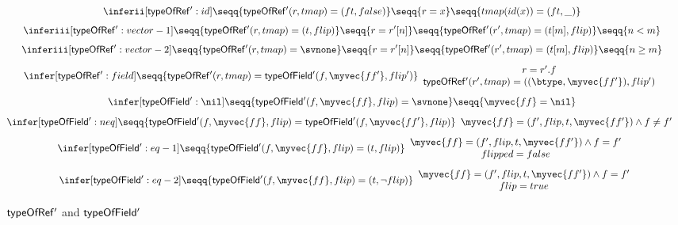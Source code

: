 {\begin{figure}[htbp]
  \small
  \begin{gather*}
   \inferii[{\sf typeOfRef'}: id]
    {\seqq{{\sf typeOfRef'}(r, tmap) = (ft, false)}}
    {\seqq{r = x}} {\seqq{tmap(id(x)) = (ft, \_)}}
    \quad
    \\[1ex]
   \inferiii[{\sf typeOfRef'}: vector-1]
    {\seqq{{\sf typeOfRef'}(r, tmap) = (t, flip)}}
    {\seqq{r = r'[n]}} {\seqq{{\sf typeOfRef'}(r', tmap) =  (t[m], flip)}} {\seqq{n < m}}
    \quad
    \\[1ex]
   \inferiii[{\sf typeOfRef'}: vector-2]
    {\seqq{{\sf typeOfRef'}(r, tmap) = \svnone}}
    {\seqq{r = r'[n]}} {\seqq{{\sf typeOfRef'}(r', tmap) = (t[m], flip)}} {\seqq{n \ge m}}
    \quad
    \\[1ex]
   \infer[{\sf typeOfRef'}: field]
    {\seqq{{\sf typeOfRef'}(r, tmap) = {\sf typeOfField'}(f, \myvec{ff'}, flip')}}
    {
    \begin{array}{c}
    r = r'.f \\
    {\sf typeOfRef'}(r', tmap) = ((\btype, \myvec{ff'}), flip')
    \end{array}
    }
    \quad
    \\[1ex]
   \infer[{\sf typeOfField'} : \nil]
    {\seqq{{\sf typeOfField'}(f, \myvec{ff}, flip) = \svnone}}
    {\seqq{\myvec{ff} = \nil}}
    \quad
    \\[1ex]
   \infer[{\sf typeOfField'}: neq]
    {\seqq{{\sf typeOfField'}(f, \myvec{ff}, flip) = {\sf typeOfField'}(f, \myvec{ff'}, flip)}}
    {
    \begin{array}{c}
    \myvec{ff} = (f', flip, t, \myvec{ff'})\wedge f \neq f'
    \end{array}
    }
    \quad
    \\[1ex]
   \infer[{\sf typeOfField'}: eq-1]
    {\seqq{{\sf typeOfField'}(f, \myvec{ff}, flip) = (t, flip)}}
    {
    \begin{array}{c}
    \myvec{ff} = (f', flip, t, \myvec{ff'}) \wedge f = f' \\
    flipped = false
    \end{array}
    }
    \quad
    \\[1ex]
   \infer[{\sf typeOfField'}: eq-2]
    {\seqq{{\sf typeOfField'}(f, \myvec{ff}, flip) = (t, \neg flip)}}
    {
    \begin{array}{c}
    \myvec{ff} = (f', flip, t, \myvec{ff'}) \wedge f = f' \\
    flip = true
    \end{array}
    }
  \end{gather*}
  \caption{${\sf typeOfRef'}$ and ${\sf typeOfField'}$}
  \label{tab:type-ref'}
\end{figure}

}
